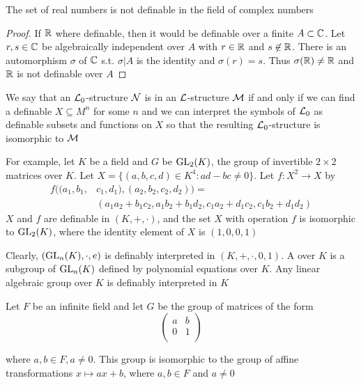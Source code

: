 \documentclass[11pt]{article}
\begin{document}
\begin{corollary}[]
The set of real numbers is not definable in the field of complex numbers
\end{corollary}

\begin{proof}
If \(\mathbb{R}\) where definable, then it would be definable over a finite
\(A\subset\mathbb{C}\). Let \(r,s\in\mathbb{C}\) be algebraically independent over \(A\) with
\(r\in\mathbb{R}\) and \(s\not\in\mathbb{R}\). There is an automorphism \(\sigma\) of \(\mathbb{C}\) s.t.
\(\sigma|A\) is the identity and \(\sigma(r)=s\). Thus \(\sigma(\mathbb{R})\neq\mathbb{R}\) and
\(\mathbb{R}\) is not definable over \(A\)
\end{proof}

We say that an \(\mathcal{L}_0\)-structure \(\mathcal{N}\) is  in
an \(\mathcal{L}\)-structure \(\mathcal{M}\) if and only if we can find a definable
\(X\subseteq M^n\) for some \(n\) and we can interpret the symbols of \(\mathcal{L}_0\)
as definable subsets and functions on \(X\) so that the resulting
\(\mathcal{L}_0\)-structure is isomorphic to \(\mathcal{M}\)


For example, let \(K\) be a field and \(G\) be \(\text{GL}_2(K)\), the group of
invertible \(2\times 2\) matrices over \(K\). Let \(X=\{(a,b,c,d)\in K^4:ad-bc\neq
   0\}\). Let \(f:X^2\to X\) by
\begin{align*}
f((a_1,b_1,&c_1,d_1),(a_2,b_2,c_2,d_2))=\\
&(a_1a_2+b_1c_2,a_1b_2+b_1d_2,c_1a_2+d_1c_2,c_1b_2+d_1d_2)
\end{align*}
\(X\) and \(f\) are definable in \((K,+,\cdot)\), and the set \(X\) with operation
\(f\) is isomorphic to \(\text{GL}_2(K)\), where the identity element of \(X\) is
\((1,0,0,1)\) 

Clearly, \((\text{GL}_n(K),\cdot,e)\) is definably interpreted in \((K,+,\cdot,0,1)\).
A  over \(K\) is a subgroup of \(\text{GL}_n(K)\) defined by
polynomial equations over \(K\). Any linear algebraic group over \(K\) is
definably interpreted in \(K\)

Let \(F\) be an infinite field and let \(G\) be the group of matrices of the form 
\[
\begin{pmatrix}
 a & b \\
 0 & 1 \\
\end{pmatrix}
\]

where \(a,b\in F, a\neq 0\). This group is isomorphic to the group of affine
transformations \(x\mapsto ax+b\), where \(a,b\in F\) and \(a\neq 0\)
\end{document}
